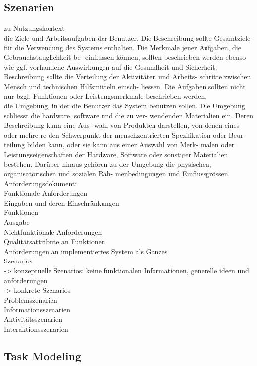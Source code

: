\subsection{Szenarien}

zu Nutzungskontext\\
die Ziele und Arbeitsaufgaben der Benutzer. Die Beschreibung sollte Gesamtziele für die Verwendung des Systems enthalten. Die Merkmale jener Aufgaben, die Gebrauchstauglichkeit be- einflussen können, sollten beschrieben werden ebenso wie ggf. vorhandene Auswirkungen auf die Gesundheit und Sicherheit. Beschreibung sollte die Verteilung der Aktivitäten und Arbeits- schritte zwischen Mensch und technischen Hilfsmitteln einsch- liessen. Die Aufgaben sollten nicht nur bzgl. Funktionen oder Leistungsmerkmale beschrieben werden,\\

die Umgebung, in der die Benutzer das System benutzen sollen. Die Umgebung schliesst die hardware, software und die zu ver- wendenden Materialien ein. Deren Beschreibung kann eine Aus- wahl von Produkten darstellen, von denen eines oder mehre-re den Schwerpunkt der menschzentrierten Spezifikation oder Beur- teilung bilden kann, oder sie kann aus einer Auswahl von Merk- malen oder Leistungseigenschaften der Hardware, Software oder sonstiger Materialien bestehen. Darüber hinaus gehören zu der Umgebung die physischen, organisatorischen und sozialen Rah- menbedingungen und Einflussgrössen.\\


Anforderungsdokument:\\
Funktionale Anforderungen\\
Eingaben und deren Einschränkungen\\
Funktionen\\
Ausgabe\\

Nichtfunktionale Anforderungen\\
Qualitätsattribute an Funktionen\\
Anforderungen an implementiertes System als Ganzes\\


Szenarios\\
-> konzeptuelle Szenarios: keine funktionalen Informationen, generelle ideen und anforderungen\\
-> konkrete Szenarios\\
Problemszenarien\\
Informationsszenarien\\
Aktivitätsszenarien\\
Interaktionsszenarien\\


\subsection{Task Modeling}



